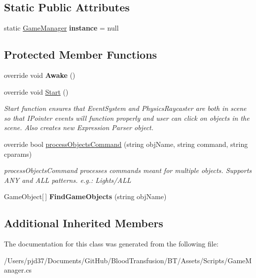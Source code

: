 \subsection*{Static Public Attributes}
\begin{DoxyCompactItemize}
\item 
static \hyperlink{class_game_manager}{Game\+Manager} {\bfseries instance} = null\hypertarget{class_game_manager_a7666e8468dac197b9eb32dd32128524f}{}\label{class_game_manager_a7666e8468dac197b9eb32dd32128524f}

\end{DoxyCompactItemize}
\subsection*{Protected Member Functions}
\begin{DoxyCompactItemize}
\item 
override void {\bfseries Awake} ()\hypertarget{class_game_manager_a707008ca02672c2dc850ccf571a6be6d}{}\label{class_game_manager_a707008ca02672c2dc850ccf571a6be6d}

\item 
override void \hyperlink{class_game_manager_a899d26c5780c61d0238baf32cbcbf373}{Start} ()\hypertarget{class_game_manager_a899d26c5780c61d0238baf32cbcbf373}{}\label{class_game_manager_a899d26c5780c61d0238baf32cbcbf373}

\begin{DoxyCompactList}\small\item\em Start function ensures that Event\+System and Physics\+Raycaster are both in scene so that I\+Pointer events will function properly and user can click on objects in the scene. Also creates new Expression Parser object. \end{DoxyCompactList}\item 
override bool \hyperlink{class_game_manager_a6c763733689eff3693175e79c6c6b210}{process\+Objects\+Command} (string obj\+Name, string command, string cparams)\hypertarget{class_game_manager_a6c763733689eff3693175e79c6c6b210}{}\label{class_game_manager_a6c763733689eff3693175e79c6c6b210}

\begin{DoxyCompactList}\small\item\em process\+Objects\+Command processes commands meant for multiple objects. Supports A\+NY and A\+LL patterns. e.\+g.\+: Lights/\+A\+LL \end{DoxyCompactList}\item 
Game\+Object\mbox{[}$\,$\mbox{]} {\bfseries Find\+Game\+Objects} (string obj\+Name)\hypertarget{class_game_manager_a4d402ce0ed803b3a5ae995d8ef94c571}{}\label{class_game_manager_a4d402ce0ed803b3a5ae995d8ef94c571}

\end{DoxyCompactItemize}
\subsection*{Additional Inherited Members}


The documentation for this class was generated from the following file\+:\begin{DoxyCompactItemize}
\item 
/\+Users/pjd37/\+Documents/\+Git\+Hub/\+Blood\+Transfusion/\+B\+T/\+Assets/\+Scripts/Game\+Manager.\+cs\end{DoxyCompactItemize}
